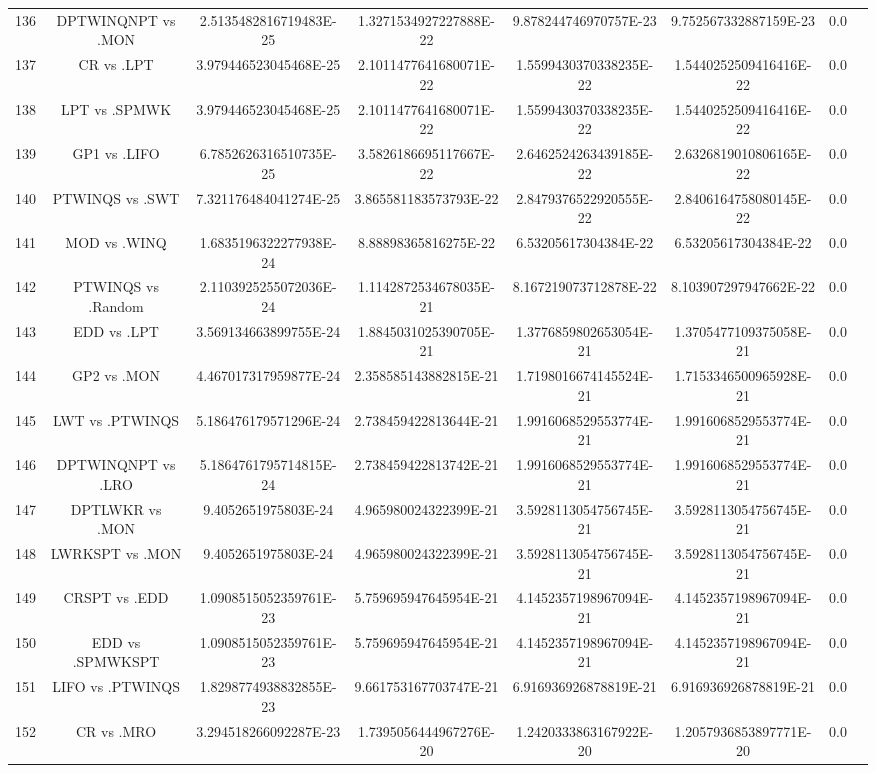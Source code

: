 \documentclass[a3paper,10pt]{article}
\begin{document}
\begin{table}[!htp]
\begin{tabular}{cccccccc}
136&DPTWINQNPT vs .MON&2.5135482816719483E-25&1.3271534927227888E-22&9.878244746970757E-23&9.752567332887159E-23&0.0\\
137&CR vs .LPT&3.979446523045468E-25&2.1011477641680071E-22&1.5599430370338235E-22&1.5440252509416416E-22&0.0\\
138&LPT vs .SPMWK&3.979446523045468E-25&2.1011477641680071E-22&1.5599430370338235E-22&1.5440252509416416E-22&0.0\\
139&GP1 vs .LIFO&6.7852626316510735E-25&3.5826186695117667E-22&2.6462524263439185E-22&2.6326819010806165E-22&0.0\\
140&PTWINQS vs .SWT&7.321176484041274E-25&3.865581183573793E-22&2.8479376522920555E-22&2.8406164758080145E-22&0.0\\
141&MOD vs .WINQ&1.6835196322277938E-24&8.88898365816275E-22&6.53205617304384E-22&6.53205617304384E-22&0.0\\
142&PTWINQS vs .Random&2.1103925255072036E-24&1.1142872534678035E-21&8.167219073712878E-22&8.103907297947662E-22&0.0\\
143&EDD vs .LPT&3.569134663899755E-24&1.8845031025390705E-21&1.3776859802653054E-21&1.3705477109375058E-21&0.0\\
144&GP2 vs .MON&4.467017317959877E-24&2.358585143882815E-21&1.7198016674145524E-21&1.7153346500965928E-21&0.0\\
145&LWT vs .PTWINQS&5.186476179571296E-24&2.738459422813644E-21&1.9916068529553774E-21&1.9916068529553774E-21&0.0\\
146&DPTWINQNPT vs .LRO&5.1864761795714815E-24&2.738459422813742E-21&1.9916068529553774E-21&1.9916068529553774E-21&0.0\\
147&DPTLWKR vs .MON&9.4052651975803E-24&4.965980024322399E-21&3.5928113054756745E-21&3.5928113054756745E-21&0.0\\
148&LWRKSPT vs .MON&9.4052651975803E-24&4.965980024322399E-21&3.5928113054756745E-21&3.5928113054756745E-21&0.0\\
149&CRSPT vs .EDD&1.0908515052359761E-23&5.759695947645954E-21&4.1452357198967094E-21&4.1452357198967094E-21&0.0\\
150&EDD vs .SPMWKSPT&1.0908515052359761E-23&5.759695947645954E-21&4.1452357198967094E-21&4.1452357198967094E-21&0.0\\
151&LIFO vs .PTWINQS&1.8298774938832855E-23&9.661753167703747E-21&6.916936926878819E-21&6.916936926878819E-21&0.0\\
152&CR vs .MRO&3.294518266092287E-23&1.7395056444967276E-20&1.2420333863167922E-20&1.2057936853897771E-20&0.0\\

\end{tabular}
\end{table}
\end{document}
